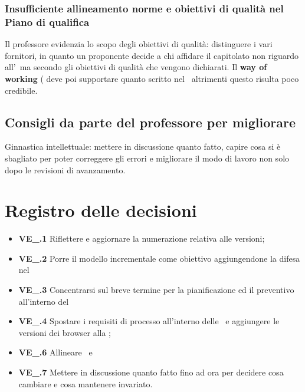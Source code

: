 \subsubsection{Insufficiente allineamento norme e obiettivi di qualità nel Piano di qualifica}
Il professore evidenzia lo scopo degli obiettivi di qualità: distinguere i vari fornitori, in quanto un proponente decide a chi affidare il capitolato non riguardo all'\AdR\, ma secondo gli obiettivi di qualità che vengono dichiarati. Il \textbf{way of working} (\NdP\) deve poi supportare quanto scritto nel \PdQ\, altrimenti questo risulta poco credibile.
\subsection{Consigli da parte del professore per migliorare}
Ginnastica intellettuale: mettere in discussione quanto fatto, capire cosa si è sbagliato per poter correggere gli errori e migliorare il modo di lavoro non solo dopo le revisioni di avanzamento.

\section{Registro delle decisioni}
\begin{itemize}
	\item \textbf{VE\_\Data.1} Riflettere e aggiornare la numerazione relativa alle versioni;
	\item \textbf{VE\_\Data.2} Porre il modello incrementale come obiettivo aggiungendone la difesa nel \PdP\;
	\item \textbf{VE\_\Data.3} Concentrarsi sul breve termine per la pianificazione ed il preventivo all'interno del \PdP\;
	\item \textbf{VE\_\Data.4} Spostare i requisiti di processo all'interno delle \NdP\ e aggiungere le versioni dei browser alla \AdR;
	\item \textbf{VE\_\Data.6} Allineare \NdP\ e \PdQ\;
	\item \textbf{VE\_\Data.7} Mettere in discussione quanto fatto fino ad ora per decidere cosa cambiare e cosa mantenere invariato.
\end{itemize}